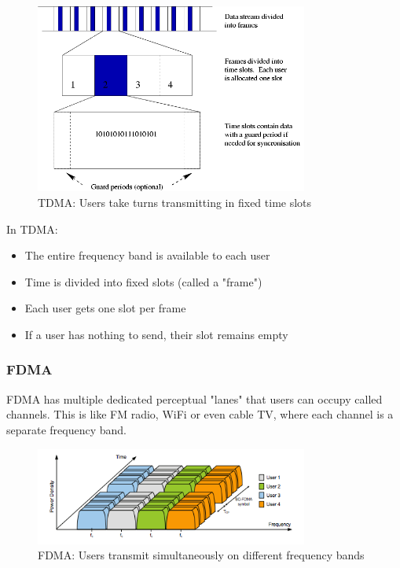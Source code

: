 \begin{figure}[h]
    \centering
    \includegraphics[width=0.8\textwidth]{assets/osi/physical/multiplexing/tdma.png}
    \caption{TDMA: Users take turns transmitting in fixed time slots}
    \label{fig:tdma}
\end{figure}

In TDMA:
\begin{itemize}
    \item The entire frequency band is available to each user
    \item Time is divided into fixed slots (called a "frame")
    \item Each user gets one slot per frame
    \item If a user has nothing to send, their slot remains empty
\end{itemize}


\subsubsection{FDMA}
FDMA has multiple dedicated perceptual "lanes" that users can occupy called channels. This is like FM radio, WiFi or even cable TV, where each channel is a separate frequency band.

\begin{figure}[h]
    \centering
    \includegraphics[width=0.8\textwidth]{assets/osi/physical/multiplexing/fdma-sc.png}
    \caption{FDMA: Users transmit simultaneously on different frequency bands}
    \label{fig:fdma}
\end{figure}

